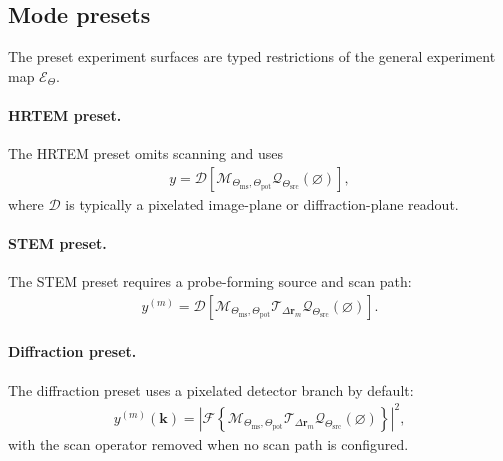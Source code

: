 \documentclass[11pt]{article}
\begin{document}
\subsection{Mode presets}
The preset experiment surfaces are typed restrictions of the general experiment map
$\mathcal{E}_{\Theta}$.

\paragraph{HRTEM preset.}
The HRTEM preset omits scanning and uses
\begin{align}
  y = \mathcal{D}\!\left[
    \mathcal{M}_{\Theta_{\mathrm{ms}},\Theta_{\mathrm{pot}}}
    \mathcal{Q}_{\Theta_{\mathrm{src}}}(\varnothing)
  \right],
\end{align}
where $\mathcal{D}$ is typically a pixelated image-plane or diffraction-plane readout.

\paragraph{STEM preset.}
The STEM preset requires a probe-forming source and scan path:
\begin{align}
  y^{(m)} = \mathcal{D}\!\left[
    \mathcal{M}_{\Theta_{\mathrm{ms}},\Theta_{\mathrm{pot}}}
    \mathcal{T}_{\Delta \mathbf{r}_m}
    \mathcal{Q}_{\Theta_{\mathrm{src}}}(\varnothing)
  \right].
\end{align}

\paragraph{Diffraction preset.}
The diffraction preset uses a pixelated detector branch by default:
\begin{align}
  y^{(m)}(\mathbf{k}) = \left|
    \mathcal{F}\left\{
      \mathcal{M}_{\Theta_{\mathrm{ms}},\Theta_{\mathrm{pot}}}
      \mathcal{T}_{\Delta \mathbf{r}_m}
      \mathcal{Q}_{\Theta_{\mathrm{src}}}(\varnothing)
    \right\}
  \right|^2,
\end{align}
with the scan operator removed when no scan path is configured.
\end{document}
